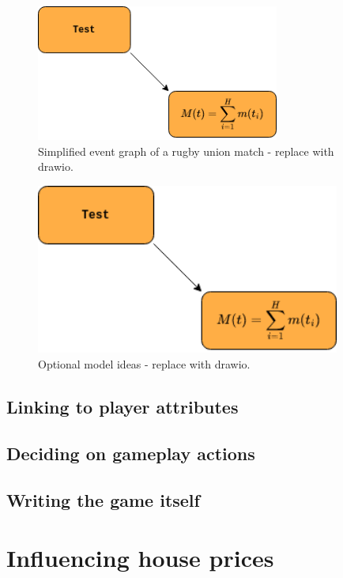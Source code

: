 \documentclass{book}
\begin{document}
\begin{figure}[h]
\includegraphics[width=8cm]{images/test.drawio.png}
\caption{Simplified event graph of a rugby union match - replace with drawio.}
\label{fig:event-graph}
\end{figure}

\begin{figure}[h]
\includegraphics[width=10cm]{images/test.drawio.png}
\caption{Optional model ideas - replace with drawio.}
\label{fig:model-ideas}
\end{figure}

\section{\sffamily Linking to player attributes}

\section{\sffamily Deciding on gameplay actions}

\section{\sffamily Writing the game itself}

\chapter{\sffamily Influencing house prices}
\end{document}
